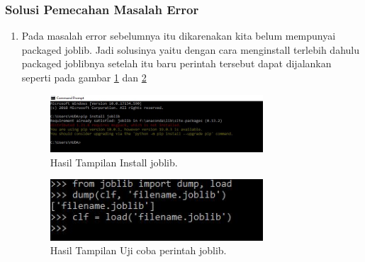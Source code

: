 \subsubsection{Solusi Pemecahan Masalah Error}
\begin{enumerate}
\item Pada masalah error sebelumnya itu dikarenakan kita belum mempunyai packaged joblib. Jadi solusinya yaitu dengan cara menginstall terlebih dahulu packaged joblibnya setelah itu baru perintah tersebut dapat dijalankan seperti pada gambar \ref{32} dan \ref{33}
\begin{figure}[!htbp]\centerline{\includegraphics[width=0.75\textwidth]{figures/huda/33.JPG}}\caption{Hasil Tampilan Install joblib.}\label{32}\end{figure}
\begin{figure}[!htbp]\centerline{\includegraphics[width=0.75\textwidth]{figures/huda/32.JPG}}\caption{Hasil Tampilan Uji coba perintah joblib.}\label{33}\end{figure}
\end{enumerate}